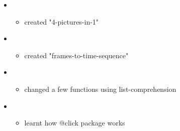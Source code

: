 \documentclass{article}
\begin{document}
\begin{itemize}
    \item \begin{itemize}
        \item created "4-pictures-in-1"
    \end{itemize}
    
    \item \begin{itemize}
        \item created "frames-to-time-sequence"
    \end{itemize}
    
    \item \begin{itemize}
        \item changed a few functions using list-comprehension
    \end{itemize}
    
    \item \begin{itemize}
        \item learnt how @click package works
    \end{itemize}
    
\end{itemize}
\end{document}
